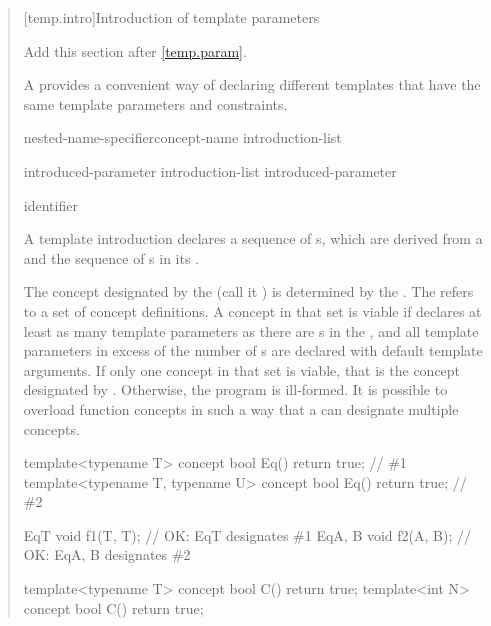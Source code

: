 \begin{quote}
[temp.intro]{Introduction of template parameters}

Add this section after \ref{temp.param}.

\pnum
A  provides a convenient way of declaring
different templates that have the same template parameters and constraints.

\begin{bnf}
\br
  nested-name-specifier\opt concept-name introduction-list

\br
  introduced-parameter\br
  introduction-list\terminal{,} introduced-parameter\br

\br
  \opt identifier
\end{bnf}

A template introduction declares a sequence of 
s, which are derived 
from a 
and the sequence of s in 
its .


\pnum
The concept designated by the 
(call it ) is determined by the 
.
% 
The   
refers to a set of concept definitions. A concept  in
that set is viable if  declares at least as many template 
parameters as there are s in 
the , and
all template parameters in excess of the number of 
s are declared with default 
template arguments.
% 
If only one concept in that set is viable, that is the concept
designated by . Otherwise, the program is ill-formed.
% 
\enterexample
It is possible to overload function concepts in such a way that a
 can designate multiple
concepts.
\begin{codeblock}
template<typename T> concept bool Eq() { return true; }             // \#1
template<typename T, typename U> concept bool Eq() { return true; } // \#2

Eq{T} void f1(T, T);    // OK: Eq{T} designates \#1
Eq{A, B} void f2(A, B); // OK: Eq{A, B} designates \#2
\end{codeblock}
\begin{codeblock}
template<typename T> concept bool C() { return true; }
template<int N> concept bool C() { return true; }


\end{codeblock}
\end{quote}

